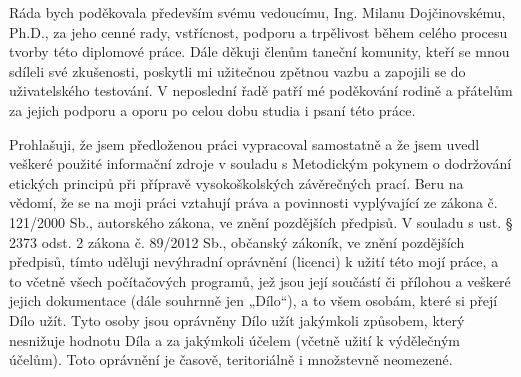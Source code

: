 \documentclass[czech,master,oneside]{ctufit-thesis}
\begin{document}
\frontmatter\frontmatterinit %

\thispagestyle{empty}\maketitle\thispagestyle{empty}\cleardoublepage %


\imprintpage %
\stopTOCentries

\begin{acknowledgmentpage}
	Ráda bych poděkovala především svému vedoucímu, Ing. Milanu Dojčinovskému, Ph.D., za jeho cenné rady, vstřícnost, podporu a trpělivost během celého procesu tvorby této diplomové práce. Dále děkuji členům taneční komunity, kteří se mnou sdíleli své zkušenosti, poskytli mi užitečnou zpětnou vazbu a zapojili se do uživatelského testování. V neposlední řadě patří mé poděkování rodině a přátelům za jejich podporu a oporu po celou dobu studia i psaní této práce.
\end{acknowledgmentpage}


\begin{declarationpage}
Prohlašuji, že jsem předloženou práci vypracoval samostatně a že jsem uvedl veškeré použité
informační zdroje v souladu s Metodickým pokynem o dodržování etických principů při přípravě
vysokoškolských závěrečných prací.
Beru na vědomí, že se na moji práci vztahují práva a povinnosti vyplývající ze zákona č. 121/2000 Sb.,
autorského zákona, ve znění pozdějších předpisů. V souladu s ust. § 2373 odst. 2 zákona č. 89/2012
Sb., občanský zákoník, ve znění pozdějších předpisů, tímto uděluji nevýhradní oprávnění (licenci) k
užití této mojí práce, a to včetně všech počítačových programů, jež jsou její součástí či přílohou a
veškeré jejich dokumentace (dále souhrnně jen „Dílo“), a to všem osobám, které si přejí Dílo užít. Tyto
osoby jsou oprávněny Dílo užít jakýmkoli způsobem, který nesnižuje hodnotu Díla a za jakýmkoli
účelem (včetně užití k výdělečným účelům). Toto oprávnění je časově, teritoriálně i množstevně
neomezené.
\end{declarationpage}
\end{document}
